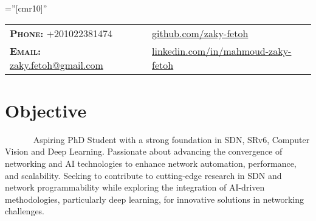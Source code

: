 \documentclass[a4paper,10pt]{article}
\begin{document}
\pagestyle{fancy}
\fancyhead{} 
\renewcommand{\headrulewidth}{0pt}

\font\fb=''[cmr10]'' 
\par{\bigskip\par} %


\begin{tabular}{lp{4cm}l}
\textbf{\textsc{Phone:}} +201022381474 && \href{https://github.com/zaky-fetoh}{github.com/zaky-fetoh} \\
\textbf{\textsc{Email:}}   \href{mailto:zaky.fetoh@gmail.com}{zaky.fetoh@gmail.com} &&\href{https://www.linkedin.com/in/mahmoud-zaky-fetoh/}{linkedin.com/in/mahmoud-zaky-fetoh}\\
\end{tabular}

\section{\textbf{Objective}}
~~~~~~ Aspiring PhD Student with a strong foundation in  SDN, SRv6, Computer Vision and Deep Learning. Passionate about advancing the convergence of networking and AI technologies to enhance network automation, performance, and scalability. Seeking to contribute to cutting-edge research in SDN and network programmability while exploring the integration of AI-driven methodologies, particularly deep learning, for innovative solutions in networking challenges.
\end{document}
